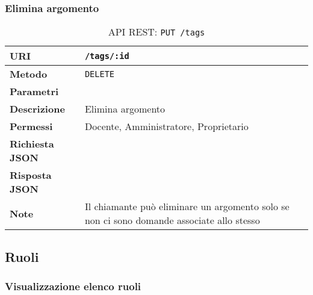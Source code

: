         \subsubsection{Elimina argomento}
        
        \begin{table}[H]
        	\begin{center}
        		\begin{tabular}{p{} p{}}
        			\toprule
        			\textbf{URI} & \texttt{/tags/:id} \\ \midrule
        			\textbf{Metodo} & \texttt{DELETE} \\ \midrule
        			\textbf{Parametri} & \\ \midrule
        			\textbf{Descrizione} & Elimina argomento \\ \midrule
        			\textbf{Permessi} & Docente, Amministratore, Proprietario  \\ \midrule
        			\textbf{Richiesta JSON} & \\ \midrule
        			\textbf{Risposta JSON} & \\ \midrule
        			\textbf{Note} & Il chiamante può eliminare un argomento solo se non ci sono domande associate allo stesso \\ 
        			\bottomrule
        		\end{tabular}
        		\caption{API REST: \texttt{PUT /tags}}
        	\end{center}
        \end{table}
    

\subsection{Ruoli}

    \subsubsection{Visualizzazione elenco ruoli}

